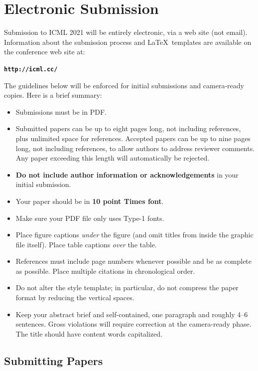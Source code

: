 \section{Electronic Submission}
\label{submission}

Submission to ICML 2021 will be entirely electronic, via a web site
(not email). Information about the submission process and \LaTeX\ templates
are available on the conference web site at:
\begin{center}
\textbf{\texttt{http://icml.cc/}}
\end{center}

The guidelines below will be enforced for initial submissions and
camera-ready copies. Here is a brief summary:
\begin{itemize}
\item Submissions must be in PDF\@.
\item Submitted papers can be up to eight pages long, not including references, plus unlimited space for references. Accepted papers can be up to nine pages long, not including references, to allow authors to address reviewer comments. Any paper exceeding this length will automatically be rejected. 
\item \textbf{Do not include author information or acknowledgements} in your
    initial submission.
\item Your paper should be in \textbf{10 point Times font}.
\item Make sure your PDF file only uses Type-1 fonts.
\item Place figure captions \emph{under} the figure (and omit titles from inside
    the graphic file itself). Place table captions \emph{over} the table.
\item References must include page numbers whenever possible and be as complete
    as possible. Place multiple citations in chronological order.
\item Do not alter the style template; in particular, do not compress the paper
    format by reducing the vertical spaces.
\item Keep your abstract brief and self-contained, one paragraph and roughly
    4--6 sentences. Gross violations will require correction at the
    camera-ready phase. The title should have content words capitalized.
\end{itemize}

\subsection{Submitting Papers}

